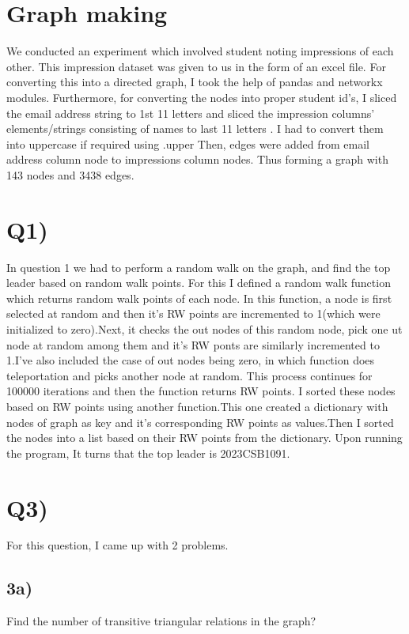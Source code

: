 \documentclass{article}
\author{Neredumalli Likhit}
\date{April 2024}
\begin{document}
\maketitle

\section*{Graph making}
We conducted an experiment which involved student noting impressions of each other. This impression dataset was given to us in the form of an excel file.
For  converting this into a directed graph, I took the help of  pandas and networkx modules. Furthermore, for converting the nodes into proper student id's, I sliced the email address string to 1st 11 letters and sliced the impression columns' elements/strings consisting of names to last 11 letters . I had to convert them into uppercase if required using .upper
Then, edges were added from email address column node to impressions column nodes. Thus forming a graph with 143 nodes and 3438 edges.
\section*{Q1)}
In question 1 we had to perform a random walk on the graph, and find the top leader based on random walk points.
For this I defined a random walk function which returns random walk points of each node. In this function,  a node is first selected at random and then it's RW points are incremented to 1(which were initialized to zero).Next, it checks the out nodes of this random node, pick one ut node at random among them and it's RW ponts are similarly incremented to 1.I've also included the case of out nodes being zero, in which function does teleportation and picks another node at random.
This process continues for 100000 iterations and then the function returns RW points.
I sorted these nodes based on RW points using another function.This one created a dictionary with nodes of graph as key and it's corresponding RW points as values.Then I sorted the nodes into a list based on their RW points from the dictionary.
Upon running the program, It turns that the top leader is 2023CSB1091.

\section*{Q3)}
For this question, I came up with 2 problems.
\subsection*{3a)}
Find the number of transitive triangular relations in the graph?
\end{document}
